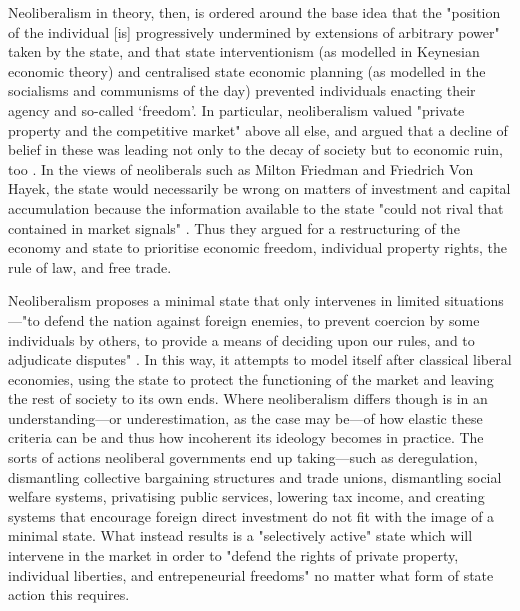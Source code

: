 Neoliberalism in theory, then, is ordered around the base idea that the "position of the individual [is] progressively undermined by extensions of arbitrary power" \citep[p. 20]{harvey_brief_2007} taken by the state, and that state interventionism (as modelled in Keynesian economic theory) and centralised state economic planning (as modelled in the socialisms and communisms of the day) prevented individuals enacting their agency and so-called `freedom'. In particular, neoliberalism valued "private property and the competitive market" above all else, and argued that a decline of belief in these was leading not only to the decay of society but to economic ruin, too \citep{mont_pelerin_society_about_2005}. In the views of neoliberals such as Milton Friedman and Friedrich Von Hayek, the state would necessarily be wrong on matters of investment and capital accumulation because the information available to the state "could not rival that contained in market signals" \citep[p. 49]{harvey_brief_2007}. Thus they argued for a restructuring of the economy and state to prioritise economic freedom, individual property rights, the rule of law, and free trade.

Neoliberalism proposes a minimal state that only intervenes in limited situations—"to defend the nation against foreign enemies, to prevent coercion by some individuals by others, to provide a means of deciding upon our rules, and to adjudicate disputes" \citep[p. 53]{connolly_fragility_2013}. In this way, it attempts to model itself after classical liberal economies, using the state to protect the functioning of the market and leaving the rest of society to its own ends. Where neoliberalism differs though is in an understanding—or underestimation, as the case may be—of how elastic these criteria can be and thus how incoherent its ideology becomes in practice. The sorts of actions neoliberal governments end up taking—such as deregulation, dismantling collective bargaining structures and trade unions, dismantling social welfare systems, privatising public services, lowering tax income, and creating systems that encourage foreign direct
investment \citep[p. 52]{harvey_brief_2007} do not fit with the image of a minimal state. What instead results is a "selectively active" state \citep[p. 21]{connolly_fragility_2013} which will intervene in the market in order to "defend the rights of private property, individual liberties, and entrepeneurial freedoms" \citep[p. 49]{harvey_brief_2007} no matter what form of state action this requires.


